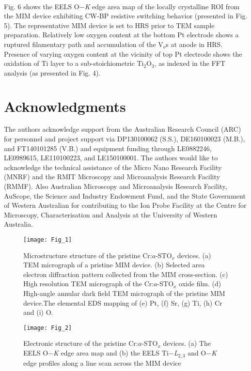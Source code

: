 \documentclass{osa-article}
\begin{document}
\paragraph*{}
Fig. 6 shows the EELS O$-$\textit{K} edge area map of the locally crystalline ROI from the MIM device exhibiting CW-BP resistive switching behavior (presented in Fig. 5). The representative MIM device is set to HRS prior to TEM sample preparation. Relatively low oxygen content at the bottom Pt electrode shows a ruptured filamentary path and accumulation of the V$_{o}$s at anode in HRS. Presence of varying oxygen content at the vicinity of top Pt electrode shows the oxidation of Ti layer to a sub-stoichiometric Ti$_{2}$O$_{3}$, as indexed in the FFT analysis (as presented in Fig. 4).
\section*{Acknowledgments}
The authors acknowledge support from the Australian Research Council (ARC) for personnel and project support via DP130100062 (S.S.), DE160100023 (M.B.), and FT140101285 (V.B.) and equipment funding through LE0882246, LE0989615, LE110100223, and LE150100001. The authors would like to acknowledge the technical assistance of the Micro Nano Research Facility (MNRF) and the RMIT Microscopy and Microanalysis Research Facility (RMMF). Also Australian Microscopy and Microanalysis Research Facility, AuScope, the Science and Industry Endowment Fund, and the State Government of Western Australian for contributing to the Ion Probe Facility at the Centre for Microscopy, Characterisation and Analysis at the University of Western Australia.



\begin{figure}[h!]
\centering\texttt{[image: Fig\_1]}
\caption{Microstructure structure of the pristine Cr:$a$-STO$_{x}$ devices. (a) TEM micrograph of a pristine MIM device. (b) Selected area electron diffraction pattern collected from the MIM cross-section. (c) High resolution TEM micrograph of the Cr:$a$-STO$_{x}$ oxide film. (d) High-angle annular dark field TEM micrograph of the pristine MIM device.The elemental EDS mapping of (e) Pt, (f) Sr, (g) Ti, (h) Cr and (i) O.}
\end{figure}

\begin{figure}[!h]
\centering\texttt{[image: Fig\_2]}
\caption{Electronic structure of the pristine Cr:$a$-STO$_{x}$ devices. (a) The EELS O$-$\textit{K} edge area map and (b) the EELS Ti$-$\textit{L}$_{2,3}$ and O$-$\textit{K} edge profiles along a line scan across the MIM device}
\end{figure}
\end{document}
